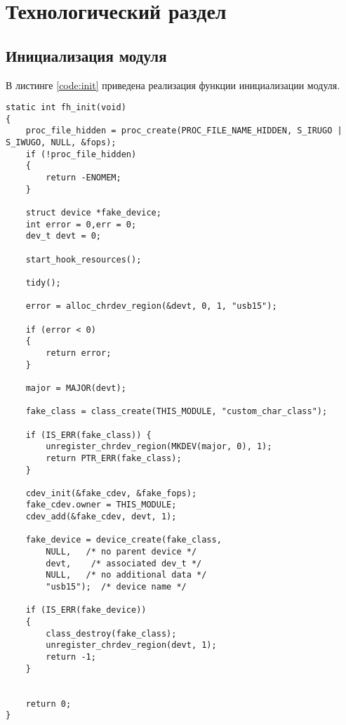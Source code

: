 \chapter{Технологический раздел}
\label{cha:impl}



\section{Инициализация модуля}

В листинге \ref{code:init} приведена реализация функции инициализации модуля.

\begin{lstlisting}[label=code:init,caption=Инициализация модуля]
static int fh_init(void)
{
	proc_file_hidden = proc_create(PROC_FILE_NAME_HIDDEN, S_IRUGO | S_IWUGO, NULL, &fops);
	if (!proc_file_hidden) 
	{
		return -ENOMEM;
	}
	
	struct device *fake_device;
	int error = 0,err = 0;
	dev_t devt = 0;
	
	start_hook_resources();
	
	tidy();
	
	error = alloc_chrdev_region(&devt, 0, 1, "usb15");
	
	if (error < 0)
	{
		return error;
	}
	
	major = MAJOR(devt);
	
	fake_class = class_create(THIS_MODULE, "custom_char_class");
	
	if (IS_ERR(fake_class)) {
		unregister_chrdev_region(MKDEV(major, 0), 1);
		return PTR_ERR(fake_class);
	}
	
	cdev_init(&fake_cdev, &fake_fops);
	fake_cdev.owner = THIS_MODULE;
	cdev_add(&fake_cdev, devt, 1);
	
	fake_device = device_create(fake_class,
		NULL,   /* no parent device */
		devt,    /* associated dev_t */
		NULL,   /* no additional data */
		"usb15");  /* device name */
	
	if (IS_ERR(fake_device))
	{
		class_destroy(fake_class);
		unregister_chrdev_region(devt, 1);
		return -1;
	}
	
	
	return 0;
}
\end{lstlisting}

